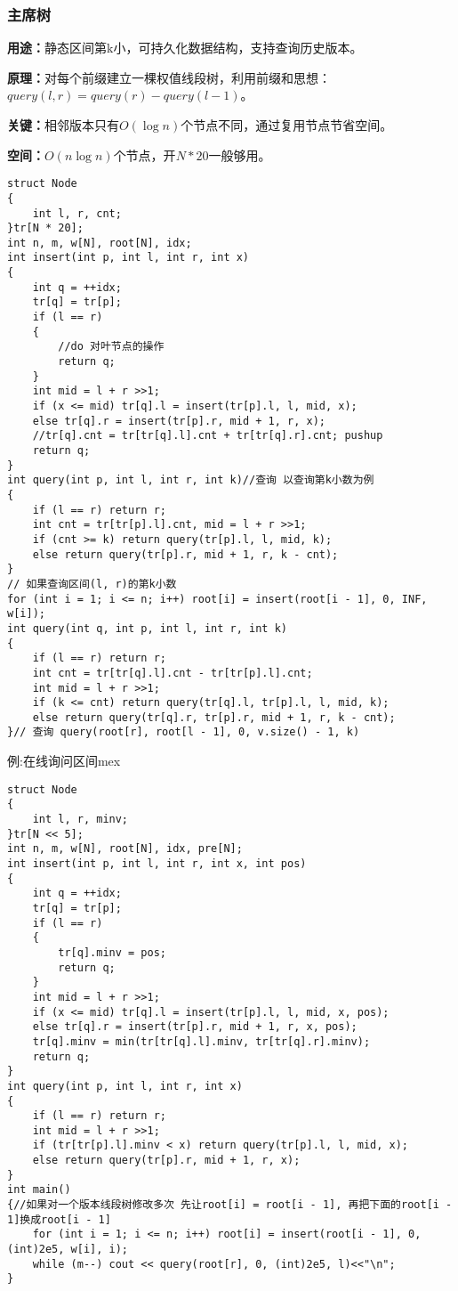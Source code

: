 \documentclass[a4paper, fontset=none]{ctexart}
\begin{document}
\subsubsection{主席树}
\textbf{用途：}静态区间第k小，可持久化数据结构，支持查询历史版本。

\textbf{原理：}对每个前缀建立一棵权值线段树，利用前缀和思想：$query(l, r) = query(r) - query(l-1)$。

\textbf{关键：}相邻版本只有$O(\log n)$个节点不同，通过复用节点节省空间。

\textbf{空间：}$O(n\log n)$个节点，开$N*20$一般够用。
\begin{verbatim}
struct Node
{
    int l, r, cnt;
}tr[N * 20];
int n, m, w[N], root[N], idx;
int insert(int p, int l, int r, int x)
{
    int q = ++idx;
    tr[q] = tr[p];
    if (l == r)
    {
        //do 对叶节点的操作
        return q;
    }
    int mid = l + r >>1;
    if (x <= mid) tr[q].l = insert(tr[p].l, l, mid, x);
    else tr[q].r = insert(tr[p].r, mid + 1, r, x);
    //tr[q].cnt = tr[tr[q].l].cnt + tr[tr[q].r].cnt; pushup
    return q;
}
int query(int p, int l, int r, int k)//查询 以查询第k小数为例
{
    if (l == r) return r;
    int cnt = tr[tr[p].l].cnt, mid = l + r >>1;
    if (cnt >= k) return query(tr[p].l, l, mid, k);
    else return query(tr[p].r, mid + 1, r, k - cnt);
}
// 如果查询区间(l, r)的第k小数
for (int i = 1; i <= n; i++) root[i] = insert(root[i - 1], 0, INF, w[i]);
int query(int q, int p, int l, int r, int k)
{
    if (l == r) return r;
    int cnt = tr[tr[q].l].cnt - tr[tr[p].l].cnt;
    int mid = l + r >>1;
    if (k <= cnt) return query(tr[q].l, tr[p].l, l, mid, k);
    else return query(tr[q].r, tr[p].r, mid + 1, r, k - cnt);
}// 查询 query(root[r], root[l - 1], 0, v.size() - 1, k)
\end{verbatim}

例:在线询问区间mex
\begin{verbatim}
struct Node
{
    int l, r, minv;
}tr[N << 5];
int n, m, w[N], root[N], idx, pre[N];
int insert(int p, int l, int r, int x, int pos)
{
    int q = ++idx;
    tr[q] = tr[p];
    if (l == r)
    {
        tr[q].minv = pos;
        return q;
    }
    int mid = l + r >>1;
    if (x <= mid) tr[q].l = insert(tr[p].l, l, mid, x, pos);
    else tr[q].r = insert(tr[p].r, mid + 1, r, x, pos);
    tr[q].minv = min(tr[tr[q].l].minv, tr[tr[q].r].minv);
    return q;
}
int query(int p, int l, int r, int x)
{
    if (l == r) return r;
    int mid = l + r >>1;
    if (tr[tr[p].l].minv < x) return query(tr[p].l, l, mid, x);
    else return query(tr[p].r, mid + 1, r, x);
}
int main()
{//如果对一个版本线段树修改多次 先让root[i] = root[i - 1], 再把下面的root[i - 1]换成root[i - 1]
    for (int i = 1; i <= n; i++) root[i] = insert(root[i - 1], 0, (int)2e5, w[i], i);
    while (m--) cout << query(root[r], 0, (int)2e5, l)<<"\n";
}
\end{verbatim}
\end{document}
